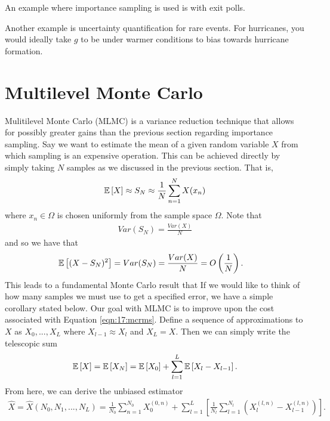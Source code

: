 An example where importance sampling is used is with exit polls. 

Another example is uncertainty quantification for rare events. For hurricanes, you would ideally take $g$ to be under warmer conditions to bias towards hurricane formation.

\section{Multilevel Monte Carlo}
Mulitilevel Monte Carlo (MLMC) is a variance reduction technique that allows for possibly greater gains than the previous section regarding importance sampling.
Say we want to estimate the mean of a given random variable $X$ from which sampling is an expensive operation.
This can be achieved directly by simply taking $N$ samples as we discussed in the previous section. That is,
\begin{align} \label{eqn:17:directmlmc}
\mathbb{E}\left[X\right] \approx S_N \approx \frac{1}{N} \sum_{n=1}^{N} X(x_n)
\end{align}
where $x_n \in \Omega$ is chosen uniformly from the sample space $\Omega$. 
Note that
\begin{align*}
    Var(S_N) = \frac{Var(X)}{N}
\end{align*}
and so we have that
\begin{align} \label{eqn:17:rms}
\mathbb{E}\left[(X-S_N)^2\right] &= Var(S_N) = \frac{Var(X)}{N} = O\left(\frac{1}{N}\right).
\end{align}
This leads to a fundamental Monte Carlo result that
If we would like to think of how many samples we must use to get a specified error, we have a simple corollary stated below.
Our goal with MLMC is to improve upon the cost associated with Equation \eqref{eqn:17:mcrms}. 
Define a sequence of approximations to $X$ as $X_0,...,X_L$ where $X_{l-1} \approx X_{l}$ and $X_L=X$.
Then we can simply write the telescopic sum 
\begin{align} \label{eqn:17:telescope}
    \mathbb{E}\left[X\right] = \mathbb{E}\left[X_{N}\right] = \mathbb{E}\left[X_0\right] + \sum_{l=1}^{L} \mathbb{E}\left[X_{l} - X_{l-1}\right].
\end{align}
From here, we can derive the unbiased estimator
\begin{align} \label{eqn:17:estimate}
    \hat{X} = \hat{X}(N_0,N_1,...,N_L) = \frac{1}{N_0} \sum_{n=1}^{N_0} X_{0}^{(0,n)} + \sum_{l=1}^{L}\left[ \frac{1}{N_l} \sum_{l=1}^{N_l} \left(X_{l}^{(l,n)} - X_{l-1}^{(l,n)}\right) \right].
\end{align}
